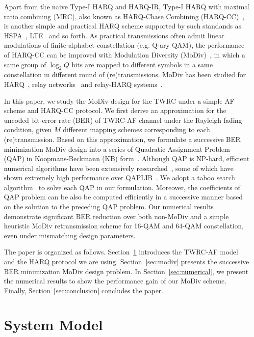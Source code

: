 \documentclass{article}
\begin{document}
Apart from the naive Type-I HARQ and HARQ-IR, Type-I HARQ with maximal ratio
combining (MRC), also known as HARQ-Chase Combining
(HARQ-CC)~\cite{chase1985code}, is another simple and practical HARQ
scheme supported by such standands as HSPA~\cite{TS25.308},
LTE~\cite{sesia2009lte} and so forth. As practical transmissions often admit
linear modulations of finite-alphabet constellation (e.g. Q-ary QAM), the
performance of HARQ-CC can be improved with Modulation Diversity
(MoDiv)~\cite{benelli1992new}, in which a same group of $\log_2Q$ bits are
mapped to different symbols in a same constellation in different round of
(re)transmissions. MoDiv has been studied for
HARQ~\cite{harvind2005symbol}, relay
networks~\cite{seddik2008trans, khormuji2008rate} and relay-HARQ
systems~\cite{kim2009design, ryu2011ber}.

In this paper, we study the MoDiv design for the TWRC under a simple AF scheme
and HARQ-CC protocol. We first derive an approximation for the uncoded bit-error
rate (BER) of TWRC-AF channel under the Rayleigh fading condition, given $M$
different mapping schemes corresponding to each (re)transmission. Based on this
approximation, we formulate a successive BER minimization MoDiv design into a
series of Quadratic Assignment Problem (QAP) in Koopmans-Beckmann (KB)
form~\cite{koopmans1957assignment}. Although QAP is NP-hard, efficient numerical
algorithms have been extensively researched~\cite{benlic2015memetic}, some of
which have shown extremely high performance over
QAPLIB~\cite{burkard1997qaplib}. We adopt a taboo search
algorithm~\cite{taillard1991robust} to solve each QAP in our formulation. Moreover, the coefficients of QAP problem can be also be computed efficiently in a
successive manner based on the solution to the preceding QAP problem. Our
numerical results demonstrate significant BER reduction over both non-MoDiv and
a simple heuristic MoDiv retransmission scheme for 16-QAM and 64-QAM
constellation, even under mismatching design parameters.

The paper is organized as follows. Section~\ref{sec:model} introduces the
TWRC-AF model and the HARQ protocol we are using. Section~\ref{sec:modiv}
presents the successive BER minimization MoDiv design problem. In
Section~\ref{sec:numerical}, we present the numerical results to show the
performance gain of our MoDiv scheme. Finally, Section~\ref{sec:conclusion}
concludes the paper.

\section{System Model}
\label{sec:model}
\end{document}
